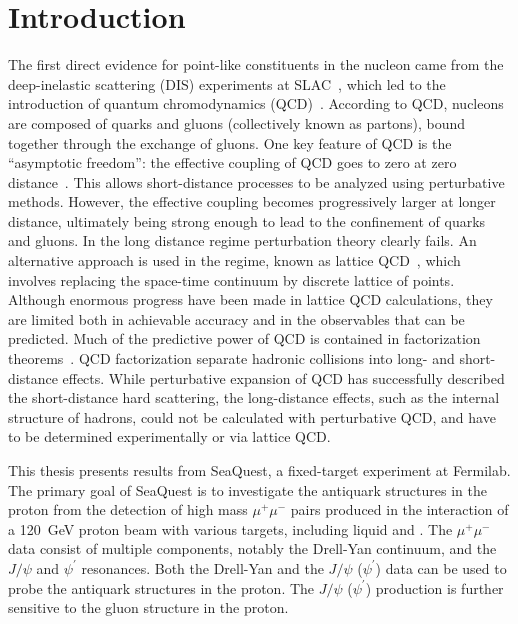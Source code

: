 \documentclass[../main.tex]{subfiles}
\begin{document}
\ifSubfilesClassLoaded{\mainmatter}{}

\chapter{Introduction}
\label{ch:intro}
The first direct evidence for point-like constituents in the nucleon came
from the deep-inelastic scattering (DIS) experiments at SLAC~\cite{breidenbach1969},
which led to the introduction of quantum chromodynamics (QCD)~\cite{fritzsch1972,fritzsch1973}.
According to QCD, nucleons are composed of quarks and gluons (collectively known as partons),
bound together through the exchange of gluons. One key feature of QCD is the ``asymptotic freedom'':
the effective coupling of QCD goes to zero at zero distance~\cite{gross1973,politzer1973}.
This allows short-distance processes to be analyzed using perturbative methods.
However, the effective coupling becomes progressively larger at longer distance,
ultimately being strong enough to lead to the confinement of quarks and gluons.
In the long distance regime perturbation theory clearly fails.
An alternative approach is used in the regime, known as lattice QCD~\cite{wilson1974},
which involves replacing the space-time continuum by discrete lattice of points.
Although enormous progress have been made in lattice QCD calculations, they are limited
both in achievable accuracy and in the observables that can be predicted.
Much of the predictive power of QCD is contained in factorization theorems~\cite{collins1989}.
QCD factorization separate hadronic collisions into long- and short-distance effects.
While perturbative expansion of QCD has successfully described the short-distance hard scattering,
the long-distance effects, such as the internal structure of hadrons,
could not be calculated with perturbative QCD, and have to be determined experimentally or via lattice QCD.

This thesis presents results from SeaQuest, a fixed-target experiment at Fermilab.
The primary goal of SeaQuest is to investigate the antiquark structures
in the proton from the detection of high mass $\mu^+\mu^-$ pairs produced in
the interaction of a \SI{120}{\GeV} proton beam with various targets, including liquid  and .
The $\mu^+\mu^-$ data consist of multiple components, notably the Drell-Yan continuum,
and the  $J/\psi$ and $\psi^\prime$ resonances.
Both the Drell-Yan and the $J/\psi$ ($\psi^\prime$) data can be used to probe
the antiquark structures in the proton.
The $J/\psi$ ($\psi^\prime$) production is further sensitive to the gluon structure in the proton.
\end{document}

